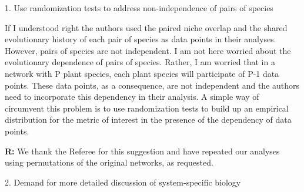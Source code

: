 \documentclass[12pt]{letter}
\newenvironment{refquote}{\bigskip \begin{it}}{\end{it}\smallskip}
\begin{document}
  1. Use randomization tests to address non-independence of pairs of species

    \begin{refquote}

      If I understood right the authors used the paired niche overlap and the shared evolutionary history of each pair of species as data points in their analyses. However, pairs of species are not independent. I am not here worried about the evolutionary dependence of pairs of species. Rather, I am worried that in a network with P plant species, each plant species will participate of P-1 data points. These data points, as a consequence, are not independent and the authors need to incorporate this dependency in their analysis. A simple way of circumvent this problem is to use randomization tests to build up an empirical distribution for the metric of interest in the presence of the dependency of data points.

      \end{refquote}

      \textbf{R:} We thank the Referee for this suggestion and have repeated our analyses using permutations of the original networks, as requested.


  2. Demand for more detailed discussion of system-specific biology
\end{document}
